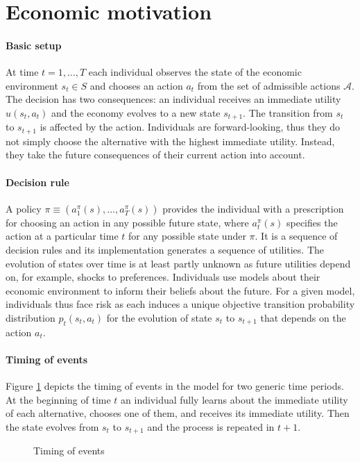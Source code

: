 \section{Economic motivation}
\paragraph{Basic setup} At time $t = 1, \hdots, T$ each individual observes the state of the economic environment $s_t\in S$ and chooses an action $a_t$ from the set of admissible actions $\mathcal{A}$. The decision has two consequences: an individual receives an immediate utility $u(s_t, a_t)$ and the economy evolves to a new state $s_{t + 1}$. The transition from $s_t$ to $s_{t + 1}$ is affected by the action.  Individuals are forward-looking, thus they do not simply choose the alternative with the highest immediate utility. Instead, they take the future consequences of their current action into account.

\paragraph{Decision rule} A policy $\pi \equiv(a^\pi_1(s), \hdots, a^\pi_T(s))$ provides the individual with a prescription for choosing an action in any possible future state, where $a^\pi_t(s)$ specifies the action at a particular time $t$ for any possible state under $\pi$. It is a sequence of decision rules and its implementation generates a sequence of utilities.  The evolution of states over time is at least partly unknown as future utilities depend on, for example, shocks to preferences. Individuals use models about their economic environment to inform their beliefs about the future. For a given model, individuals thus face risk as each induces a unique objective transition probability distribution $p_t(s_t, a_t)$ for the evolution of state $s_t$ to $s_{t + 1}$ that depends on the action $a_t$.

\paragraph{Timing of events} Figure \ref{Timing} depicts the timing of events in the model for two generic time periods. At the beginning of time $t$ an individual fully learns about the immediate utility of each alternative, chooses one of them, and receives its immediate utility. Then the state evolves from $s_t$ to $s_{t + 1}$ and the process is repeated in $t + 1$.
%
\begin{figure}\caption{Timing of events}\label{Timing}\vspace{1.0cm}\centering

\end{figure}
%
